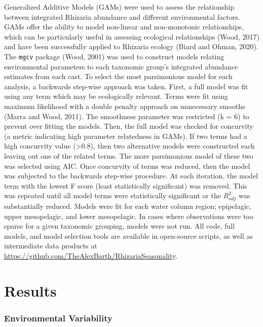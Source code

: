 \documentclass[
]{article}
\begin{document}
Generalized Additive Models (GAMs) were used to assess the relationship
between integrated Rhizaria abundance and different environmental
factors. GAMs offer the ability to model non-linear and non-monotonic
relationships, which can be particularly useful in assessing ecological
relationships (Wood, 2017) and have been successfully applied to
Rhizaria ecology (Biard and Ohman, 2020). The \texttt{mgcv} package
(Wood, 2001) was used to construct models relating environmental
parameters to each taxonomic group's integrated abundance estimates from
each cast. To select the most parsimonious model for each analysis, a
backwards step-wise approach was taken. First, a full model was fit
using any term which may be ecologically relevant. Terms were fit using
maximum likelihood with a double penalty approach on unnecessary smooths
(Marra and Wood, 2011). The smoothness parameter was restricted (k = 6)
to prevent over fitting the models. Then, the full model was checked for
concurvity (a metric indicating high parameter relatedness in GAMs). If
two terms had a high concurvity value (\textgreater0.8), then two
alternative models were constructed each leaving out one of the related
terms. The more parsimonious model of these two was selected using AIC.
Once concurvity of terms was reduced, then the model was subjected to
the backwards step-wise procedure. At each iteration, the model term
with the lowest F score (least statistically significant) was removed.
This was repeated until all model terms were statistically significant
or the \(R^2_{adj}\) was substantially reduced. Models were fit for each
water column region; epipelagic, upper mesopelagic, and lower
mesopelagic. In cases where observations were too sparse for a given
taxonomic grouping, models were not run. All code, full models, and
model selection tools are available in open-source scripts, as well as
intermediate data products at
\url{https://github.com/TheAlexBarth/RhizariaSeasonality}.

\section{Results}\label{results}

\subsubsection{Environmental
Variability}\label{environmental-variability}
\end{document}
